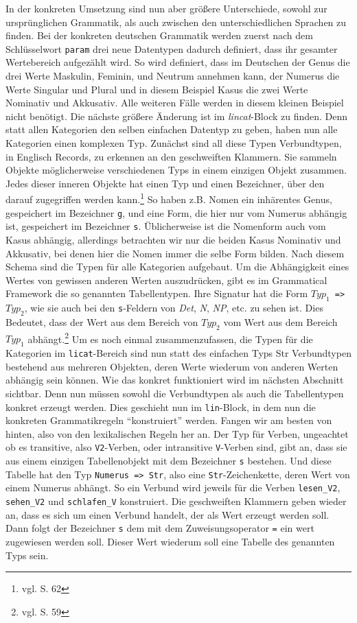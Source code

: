 \documentclass[fontsize=12pt,abstract=on,titlepage,bibliography=totoc,ngerman,listof=totoc]{scrreprt}
\begin{document}
In der konkreten Umsetzung sind nun aber größere Unterschiede, sowohl zur ursprünglichen Grammatik, als auch zwischen den unterschiedlichen Sprachen zu finden. Bei der konkreten deutschen Grammatik werden zuerst nach dem Schlüsselwort \texttt{param} drei neue Datentypen dadurch definiert, dass ihr gesamter Wertebereich aufgezählt wird. So wird definiert, dass im Deutschen der Genus die drei Werte Maskulin, Feminin, und Neutrum annehmen kann, der Numerus die Werte Singular und Plural und in diesem Beispiel Kasus die zwei Werte Nominativ und Akkusativ. Alle weiteren Fälle werden in diesem kleinen Beispiel nicht benötigt. Die nächste größere Änderung ist im \textit{lincat}-Block zu finden. Denn statt allen Kategorien den selben einfachen Datentyp zu geben, haben nun alle Kategorien einen komplexen Typ. Zunächst sind all diese Typen Verbundtypen, in Englisch Records, zu erkennen an den geschweiften Klammern. Sie sammeln Objekte möglicherweise verschiedenen Typs in einem einzigen Objekt zusammen. Jedes dieser inneren Objekte hat einen Typ und einen Bezeichner, über den darauf zugegriffen werden kann.\footnote{vgl. \cite{RANTA2011} S. 62} So haben z.B. Nomen ein inhärentes Genus, gespeichert im Bezeichner \texttt{g}, und eine Form, die hier nur vom Numerus abhängig ist, gespeichert im Bezeichner \texttt{s}. Üblicherweise ist die Nomenform auch vom Kasus abhängig, allerdings betrachten wir nur die beiden Kasus Nominativ und Akkusativ, bei denen hier die Nomen immer die selbe Form bilden. Nach diesem Schema sind die Typen für alle Kategorien aufgebaut. Um die Abhängigkeit eines Wertes von gewissen anderen Werten auszudrücken, gibt es im Grammatical Framework die so genannten Tabellentypen. Ihre Signatur hat die Form \texttt{$Typ_1$ => $Typ_2$}, wie sie auch bei den \texttt{s}-Feldern von \textit{Det}, \textit{N}, \textit{NP}, etc. zu sehen ist. Dies Bedeutet, dass der Wert aus dem Bereich von $Typ_2$ vom Wert aus dem Bereich $Typ_1$ abhängt.\footnote{vgl. \cite{RANTA2011} S. 59} Um es noch einmal zusammenzufassen, die Typen für die Kategorien im \texttt{licat}-Bereich sind nun statt des einfachen Typs Str Verbundtypen bestehend aus mehreren Objekten, deren Werte wiederum von anderen Werten abhängig sein können. Wie das konkret funktioniert wird im nächsten Abschnitt sichtbar. Denn nun müssen sowohl die Verbundtypen als auch die Tabellentypen konkret erzeugt werden. Dies geschieht nun im \texttt{lin}-Block, in dem nun die konkreten Grammatikregeln ``konstruiert'' werden. Fangen wir am besten von hinten, also von den lexikalischen Regeln her an. Der Typ für Verben, ungeachtet ob es transitive, also \texttt{V2}-Verben, oder intransitive \texttt{V}-Verben sind, gibt an, dass sie aus einem einzigen Tabellenobjekt mit dem Bezeichner \texttt{s} bestehen. Und diese Tabelle hat den Typ \texttt{Numerus => Str}, also eine \texttt{Str}-Zeichenkette, deren Wert von einem Numerus abhängt. So ein Verbund wird jeweils für die Verben \texttt{lesen\_V2}, \texttt{sehen\_V2} und \texttt{schlafen\_V} konstruiert. Die geschweiften Klammern geben wieder an, dass es sich um einen Verbund handelt, der als Wert erzeugt werden soll. Dann folgt der Bezeichner \texttt{s} dem mit dem Zuweisungsoperator \texttt{=} ein wert zugewiesen werden soll. Dieser Wert wiederum soll eine Tabelle des genannten Typs sein. 
\end{document}
